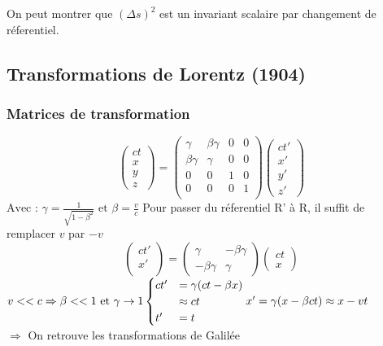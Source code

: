 \documentclass{article}
\begin{document}
On peut montrer que $(\Delta s)^2$ est un invariant scalaire par changement de réferentiel.
\subsection{Transformations de Lorentz (1904)}
\subsubsection{Matrices de transformation}
\begin{equation*}
    \begin{pmatrix}
        ct\\
        x\\
        y\\
        z
    \end{pmatrix}
     = \begin{pmatrix}
        \gamma & \beta\gamma&0&0\\
        \beta\gamma & \gamma &0&0\\
        0&0&1&0\\
        0&0&0&1\\
     \end{pmatrix}
     \begin{pmatrix}
        ct'\\
        x'\\
        y'\\
        z'
    \end{pmatrix}
\end{equation*}
\linebreak
\linebreak
$\text{Avec : } \gamma = \frac{1}{\sqrt{1-\beta^2}} \text{ et } \beta = \frac{v}{c}$
Pour passer du réferentiel R' à R, il suffit de remplacer $v$ par $-v$
\begin{equation*}
    \begin{pmatrix}
        ct'\\
        x'\\
    \end{pmatrix}
     = \begin{pmatrix}
        \gamma&-\beta\gamma\\
        -\beta\gamma&\gamma
     \end{pmatrix}
     \begin{pmatrix}
        ct\\
        x
     \end{pmatrix}
\end{equation*}
\(
    v<<c \Rightarrow \beta<<1 \text{ et } \gamma \rightarrow 1\\
    \begin{cases}
        ct' &= \gamma(ct - \beta x)\\
        &\approx ct\\
        t'&=t
    \end{cases}\\
    x' = \gamma(x - \beta ct) \approx x-vt
\)\\
$\Rightarrow$ On retrouve les transformations de Galilée
\end{document}

